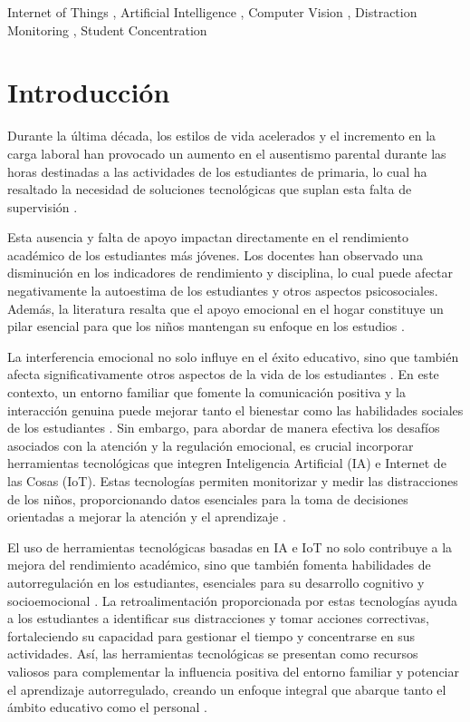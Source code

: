 \documentclass[a4paper,fleqn]{cas-sc}
\begin{document}
	\begin{keywords}
		Internet of Things \sep
		Artificial Intelligence \sep
		Computer Vision \sep
		Distraction Monitoring \sep
		Student Concentration
	\end{keywords}
	
	\maketitle
	
	\section{Introducción}
	\label{seccion:Uno}
		Durante la última década, los estilos de vida acelerados y el incremento en la carga laboral han provocado un aumento en el ausentismo parental durante las horas destinadas a las actividades de los estudiantes de primaria, lo cual ha resaltado la necesidad de soluciones tecnológicas que suplan esta falta de supervisión \cite{Abdul-Aziz2022,Ketsman2025Mapping}.
		
		Esta ausencia y falta de apoyo impactan directamente en el rendimiento académico de los estudiantes más jóvenes. Los docentes han observado una disminución en los indicadores de rendimiento y disciplina, lo cual puede afectar negativamente la autoestima de los estudiantes y otros aspectos psicosociales. Además, la literatura resalta que el apoyo emocional en el hogar constituye un pilar esencial para que los niños mantengan su enfoque en los estudios \citep{Abdul-Aziz2022}.
		
		La interferencia emocional no solo influye en el éxito educativo, sino que también afecta significativamente otros aspectos de la vida de los estudiantes \citep{Ake2023}. En este contexto, un entorno familiar que fomente la comunicación positiva y la interacción genuina puede mejorar tanto el bienestar como las habilidades sociales de los estudiantes \citep{Navarro2024}. Sin embargo, para abordar de manera efectiva los desafíos asociados con la atención y la regulación emocional, es crucial incorporar herramientas tecnológicas que integren Inteligencia Artificial (IA) e Internet de las Cosas (IoT). Estas tecnologías permiten monitorizar y medir las distracciones de los niños, proporcionando datos esenciales para la toma de decisiones orientadas a mejorar la atención y el aprendizaje \citep{Alvear-Puertas2017,Berrezueta-Guzman2021}.
		
		El uso de herramientas tecnológicas basadas en IA e IoT no solo contribuye a la mejora del rendimiento académico, sino que también fomenta habilidades de autorregulación en los estudiantes, esenciales para su desarrollo cognitivo y socioemocional \citep{Mohamed2018Implementing}. La retroalimentación proporcionada por estas tecnologías ayuda a los estudiantes a identificar sus distracciones y tomar acciones correctivas, fortaleciendo su capacidad para gestionar el tiempo y concentrarse en sus actividades. Así, las herramientas tecnológicas se presentan como recursos valiosos para complementar la influencia positiva del entorno familiar y potenciar el aprendizaje autorregulado, creando un enfoque integral que abarque tanto el ámbito educativo como el personal \cite{Thinyane2016AUG}.
		
\end{document}

